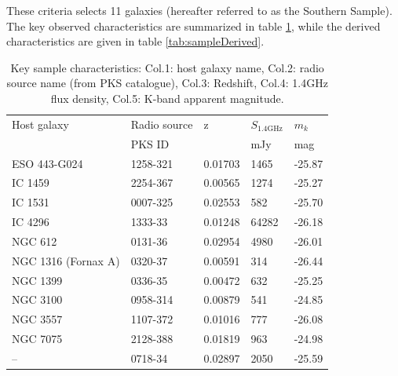 	These criteria selects 11 galaxies (hereafter referred to as the Southern Sample). The key observed characteristics are summarized in table \ref{tab:sample}, while the derived characteristics are given in table \ref{tab:sampleDerived}.

	\begin{table}
		\centering
		\caption{Key sample characteristics: Col.1: host galaxy name, Col.2: radio source name (from PKS catalogue), Col.3: Redshift, Col.4: 1.4GHz flux density, Col.5: K-band apparent magnitude.}
		\label{tab:sample}
		\begin{tabular}{l l l l l}
			\hline
			\hline
			Host galaxy	& Radio source 	& z 		& $S_\text{1.4GHz}$	& $m_k$ \\
						& PKS ID 		& 			& mJy 				& mag \\
			\hline 
			ESO 443-G024 & 1258-321 	& 0.01703	& 1465 				& -25.87 \\ 
			IC 1459 	& 2254-367 		& 0.00565 	& 1274 				& -25.27 \\
			IC 1531 	& 0007-325 		& 0.02553 	& 582 				& -25.70 \\
			IC 4296		& 1333-33 		& 0.01248 	& 64282 			& -26.18 \\
			NGC 612 	& 0131-36 		& 0.02954 	& 4980 				& -26.01 \\ %
			NGC 1316 (Fornax A) & 0320-37 & 0.00591 & 314 				& -26.44 \\
			NGC 1399 	& 0336-35 		& 0.00472 	& 632 				& -25.25 \\
			NGC 3100 	& 0958-314 		& 0.00879 	& 541 				& -24.85 \\
			NGC 3557 	& 1107-372 		& 0.01016 	& 777 				& -26.08 \\
			NGC 7075 	& 2128-388 		& 0.01819 	& 963 				& -24.98 \\
			--			& 0718-34 		& 0.02897 	& 2050 				& -25.59 \\
			\hline
			\hline
		\end{tabular}
	\end{table}



